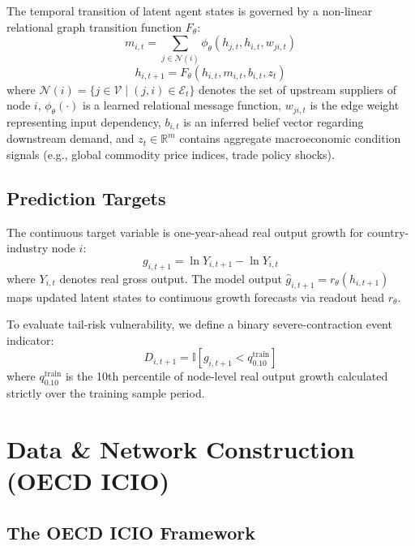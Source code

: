 \documentclass[11pt,a4paper]{article}
\newcommand{\R}{\mathbb{R}}
\newcommand{\I}{\mathbb{I}}
\newcommand{\V}{\mathcal{V}}
\newcommand{\Eset}{\mathcal{E}}
\newcommand{\N}{\mathcal{N}}
\begin{document}
The temporal transition of latent agent states is governed by a non-linear relational graph transition function $F_\theta$:
\begin{equation}
    m_{i,t} = \sum_{j \in \N(i)} \phi_\theta \left( h_{j,t}, h_{i,t}, w_{ji,t} \right)
    \label{eq:message_passing}
\end{equation}
\begin{equation}
    h_{i,t+1} = F_\theta \left( h_{i,t}, m_{i,t}, b_{i,t}, z_t \right)
    \label{eq:state_update}
\end{equation}
where $\N(i) = \{j \in \V \mid (j,i) \in \Eset_t\}$ denotes the set of upstream suppliers of node $i$, $\phi_\theta(\cdot)$ is a learned relational message function, $w_{ji,t}$ is the edge weight representing input dependency, $b_{i,t}$ is an inferred belief vector regarding downstream demand, and $z_t \in \R^m$ contains aggregate macroeconomic condition signals (e.g., global commodity price indices, trade policy shocks).

\subsection{Prediction Targets}

The continuous target variable is one-year-ahead real output growth for country-industry node $i$:
\begin{equation}
    g_{i,t+1} = \ln Y_{i,t+1} - \ln Y_{i,t}
    \label{eq:target_continuous}
\end{equation}
where $Y_{i,t}$ denotes real gross output. The model output $\hat{g}_{i,t+1} = r_\theta(h_{i,t+1})$ maps updated latent states to continuous growth forecasts via readout head $r_\theta$.

To evaluate tail-risk vulnerability, we define a binary severe-contraction event indicator:
\begin{equation}
    D_{i,t+1} = \I \left[ g_{i,t+1} < q_{0.10}^{\text{train}} \right]
    \label{eq:target_tail}
\end{equation}
where $q_{0.10}^{\text{train}}$ is the 10th percentile of node-level real output growth calculated strictly over the training sample period.

\section{Data \& Network Construction (OECD ICIO)}
\label{sec:data}

\subsection{The OECD ICIO Framework}
\end{document}
